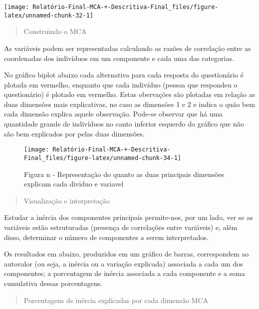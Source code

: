 \documentclass[
]{article}
\begin{document}
\begin{center}\texttt{[image: Relatório-Final-MCA-+-Descritiva-Final\_files/figure-latex/unnamed-chunk-32-1]} \end{center}

\begin{quote}
Construindo o MCA
\end{quote}

As variáveis podem ser representadas calculando as razões de correlação
entre as coordenadas dos indivíduos em um componente e cada uma das
categorias.

No gráfico biplot abaixo cada alternativa para cada resposta do
questionário é plotada em vermelho, enquanto que cada indivíduo (pessoa
que respondeu o questionário) é plotado em vermelho. Estas obervações
são plotadas em relação as duas dimensões mais explicativas, no caso as
dimensões 1 e 2 e indica o quão bem cada dimensão explica aquele
observação. Pode-se observar que há uma quantidade grande de indivíduos
no canto inferior esquerdo do gráfico que não são bem explicados por
pelas duas dimensões.

\begin{figure}

{\centering \texttt{[image: Relatório-Final-MCA-+-Descritiva-Final\_files/figure-latex/unnamed-chunk-34-1]} 

}

\caption{Figura n - Representação do quanto as duas principais dimensões explicam cada dividuo e variavel}\label{fig:unnamed-chunk-34}
\end{figure}

\begin{quote}
Visualização e interpretação
\end{quote}

Estudar a inércia dos componentes principais permite-nos, por um lado,
ver se as variáveis estão estruturadas (presença de correlações entre
variáveis) e, além disso, determinar o número de componentes a serem
interpretados.

Os resultados em abaixo, produzidos em um gráfico de barras,
correspondem ao autovalor (ou seja, a inércia ou a variação explicada)
associada a cada um dos componentes; a porcentagem de inércia associada
a cada componente e a soma cumulativa dessas porcentagens.

\begin{quote}
Porcentagens de inércia explicadas por cada dimensão MCA
\end{quote}
\end{document}

